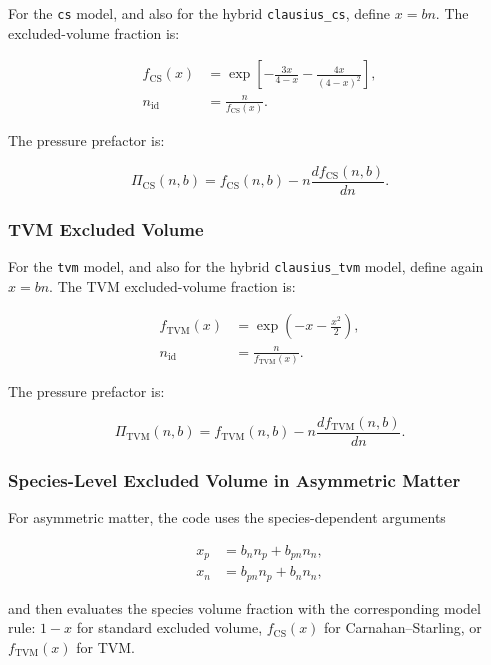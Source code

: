 \documentclass[11pt]{article}
\begin{document}
For the \texttt{cs} model, and also for the hybrid \texttt{clausius\_cs},
define $x = bn$.  The excluded-volume fraction is:

\begin{align}
f_{\mathrm{CS}}(x) &=
\exp\left[
-\frac{3x}{4-x} - \frac{4x}{(4-x)^2}
\right], \\
n_{\mathrm{id}} &= \frac{n}{f_{\mathrm{CS}}(x)}.
\end{align}

The pressure prefactor is:

\begin{equation}
\Pi_{\mathrm{CS}}(n,b) =
f_{\mathrm{CS}}(n,b) - n \frac{d f_{\mathrm{CS}}(n,b)}{dn}.
\end{equation}

\subsubsection{TVM Excluded Volume}

For the \texttt{tvm} model, and also for the hybrid \texttt{clausius\_tvm}
model, define again $x = bn$.  The TVM excluded-volume fraction is:

\begin{align}
f_{\mathrm{TVM}}(x) &= \exp\left(-x - \frac{x^2}{2}\right), \\
n_{\mathrm{id}} &= \frac{n}{f_{\mathrm{TVM}}(x)}.
\end{align}

The pressure prefactor is:

\begin{equation}
\Pi_{\mathrm{TVM}}(n,b) =
f_{\mathrm{TVM}}(n,b) - n \frac{d f_{\mathrm{TVM}}(n,b)}{dn}.
\end{equation}

\subsubsection{Species-Level Excluded Volume in Asymmetric Matter}

For asymmetric matter, the code uses the species-dependent arguments

\begin{align}
x_p &= b_n n_p + b_{pn} n_n, \\
x_n &= b_{pn} n_p + b_n n_n,
\end{align}

and then evaluates the species volume fraction with the corresponding model
rule: $1-x$ for standard excluded volume, $f_{\mathrm{CS}}(x)$ for
Carnahan--Starling, or $f_{\mathrm{TVM}}(x)$ for TVM.
\end{document}
